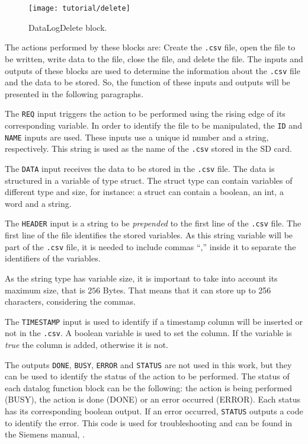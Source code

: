 \begin{figure}[H] \centering
\begin{minipage}{.45\textwidth}
  \centering
 \texttt{[image: tutorial/delete]}
  \caption{DataLogDelete block.}
  \label{fig:datalogdelete}
\end{minipage}
\end{figure}
The actions performed by these blocks are: Create the \verb|.csv| file, open the
file to be written, write data to the file, close the file, and delete the file. 
The inputs and outputs of these blocks are used to determine the information
about the \verb|.csv| file and the data to be stored.
So, the function
of these inputs and
outputs will be presented in the following paragraphs.

The \verb|REQ| input triggers the action to be performed using the rising edge
of its corresponding variable.
In order to identify the file to be manipulated, the \verb|ID| and \verb|NAME|
inputs are used. These inputs use a unique id number and a string, respectively. This string is used as the name of the
\verb|.csv| stored in the SD card.

The \verb|DATA| input receives the data to be stored in the \verb|.csv| file.
The data is structured in a variable of type struct. The struct type can contain variables of different type and size, for instance: a struct can contain a boolean,
an int, a word
and a string.

The \verb|HEADER| input is a string to be \emph{prepended} to the first line of
the \verb|.csv| file. The first line of the file identifies the
stored variables. As this string variable will be part of the \verb|.csv| file, it is needed to
include commas ``,'' inside it to separate the identifiers of the variables.

\begin{observation}
  \label{obs:stringSize}
 As the string type has variable size, it is important to take into account its
 maximum size, that is $256$ Bytes. That means that it can store up to 256 characters,
 considering the commas.
\end{observation}

The \verb|TIMESTAMP| input is used to identify if a timestamp column will be inserted or not in the \verb|.csv|. A boolean variable is
used to set the column. If the variable is \emph{true} the column is added, otherwise it
is not.

The outputs \verb|DONE|, \verb|BUSY|, \verb|ERROR| and \verb|STATUS| are not used
in this work, but they can be used to identify the status of the action to be
performed. The status of each datalog function block can be the following: the action is being
performed (BUSY), the action is done (DONE) or an error occurred (ERROR). Each
status has its corresponding boolean output. If an error occurred, \verb|STATUS| outputs
a code to identify the error. This code is used for troubleshooting
and can be found in the Siemens manual, \cite{datalogSiemens}.

